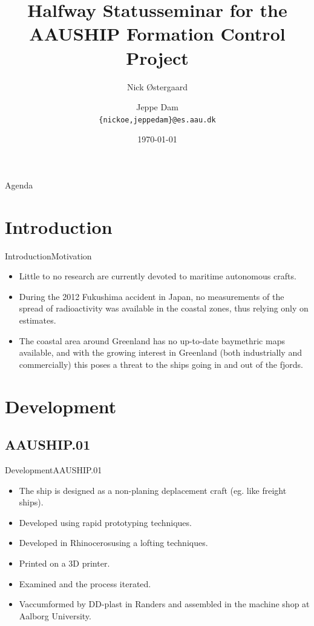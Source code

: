 \documentclass[10pt,handout]{beamer}
\title[AAUSHIP Formation Control]%
{Halfway Statusseminar for the\\ AAUSHIP Formation Control Project}
\author[14gr1034]{%
  Nick Østergaard \and Jeppe Dam\\
  {{\tt \{nickoe,jeppedam\}@es.aau.dk}}
}
\institute[
  Dept.\ of Electronic Systems,\\
  Aalborg University,\\
  Denmark
] %
{%
  Department of Electronic Systems,\\
  Aalborg University,\\
  Denmark
  
}
\date{\today}
\begin{document}
\begin{frame}[plain] %
  \titlepage
\end{frame}

\begin{frame}{Agenda}{}
\tableofcontents
\end{frame}
\section{Introduction}
\begin{frame}{Introduction}{Motivation}
  \begin{itemize}
  	\item<1-> Little to no research are currently devoted to maritime autonomous crafts.
    \item<2-> During the 2012 Fukushima accident in Japan, no measurements of the spread of radioactivity was available in the coastal zones, thus relying only on estimates. 
    \item<3-> The coastal area around Greenland has no up-to-date baymethric maps available, and with the growing interest in Greenland (both industrially and commercially) this poses a threat to the ships going in and out of the fjords.
  \end{itemize}
\end{frame}

\section{Development}
\subsection{AAUSHIP.01}
\begin{frame}{Development}{AAUSHIP.01}
\begin{itemize}
	\item<1-> The ship is designed as a non-planing deplacement craft (eg. like freight ships).
	\item<2-> Developed using rapid prototyping techniques.
	\item<3-> Developed in Rhinoceros\texttrademark using a lofting techniques.
	\item<4-> Printed on a 3D printer.
	\item<5-> Examined and the process iterated.
	\item<6-> Vaccumformed by DD-plast in Randers and assembled in the machine shop at Aalborg University.
\end{itemize}
\end{frame}
\end{document}
